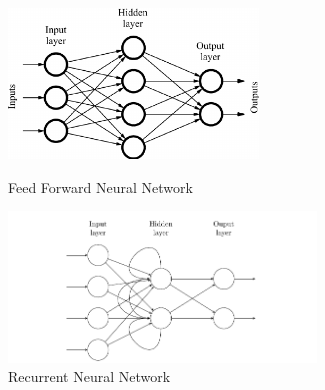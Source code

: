 \begin{figure}[H]
	
	\includegraphics[height=4cm]{images/feed_forward_neural_net.png}
	\caption{Feed Forward Neural Network}
	\label{fig:ff_neural_net}
	\endminipage
	\hfill
	\includegraphics[height=4cm]{images/recurrent_neural_net.png}
	\caption{Recurrent Neural Network}
	\label{fig:rec_neural_net}
	\endminipage
\end{figure}


